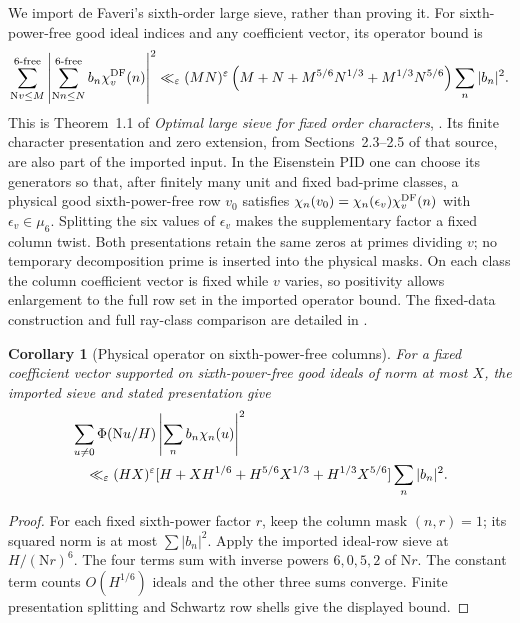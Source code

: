 \documentclass[11pt]{article}
\numberwithin{equation}{section}
\newtheorem{corollary}[theorem]{Corollary}
\theoremstyle{definition}
\theoremstyle{remark}
\newcommand{\N}{\mathrm N}
\newcommand{\eps}{\varepsilon}
\begin{document}
We import de Faveri's sixth-order large sieve, rather than proving it.
For sixth-power-free good ideal indices and any coefficient vector,
its operator bound is
\begin{equation}\label{eq:imported-sextic-sieve}
 \sum_{\N v\le M}^{\text{$6$-free}}
 \left|\sum_{\N n\le N}^{\text{$6$-free}}b_n\chi_v^{\rm DF}(n)\right|^2
 \ll_\eps(MN)^\eps
 \left(M+N+M^{5/6}N^{1/3}+M^{1/3}N^{5/6}\right)\sum_n|b_n|^2.
\end{equation}
This is Theorem~1.1 of \emph{Optimal large sieve for fixed order characters},
\cite{DF}. Its finite character presentation and zero extension,
from Sections~2.3--2.5 of that source, are also part of the imported
input. In the Eisenstein PID one can choose its generators so that,
after finitely many unit and fixed bad-prime classes, a physical good
sixth-power-free row $v_0$ satisfies
$\chi_n(v_0)=\chi_n(\epsilon_v)\chi_v^{\rm DF}(n)$ with
$\epsilon_v\in\mu_6$. Splitting the six values of $\epsilon_v$ makes
the supplementary factor a fixed column twist. Both presentations
retain the same zeros at primes dividing $v$; no temporary decomposition
prime is inserted into the physical masks. On each class the column
coefficient vector is fixed while $v$ varies, so positivity allows
enlargement to the full row set in the imported operator bound.
The fixed-data construction and full ray-class comparison are
detailed in \cite{N6}.

\begin{corollary}[Physical operator on sixth-power-free columns]
\label{cor:physical-operator}
For a fixed coefficient vector supported on sixth-power-free good ideals
of norm at most \(X\), the imported sieve and stated presentation give
\begin{align}
 &\sum_{u\ne0}\Phi(\N u/H)
       \left|\sum_n b_n\chi_n(u)\right|^2\notag\\
 &\quad\ll_\eps(HX)^\eps
 [H+XH^{1/6}+H^{5/6}X^{1/3}+H^{1/3}X^{5/6}]
       \sum_n|b_n|^2. \label{eq:physical-operator}
\end{align}
\end{corollary}
\begin{proof}
For each fixed sixth-power factor \(r\), keep the column mask
\((n,r)=1\); its squared norm is at most \(\sum|b_n|^2\).
Apply the imported ideal-row sieve at \(H/(\N r)^6\).
The four terms sum with inverse powers \(6,0,5,2\) of \(\N r\).
The constant term counts \(O(H^{1/6})\) ideals and the other
three sums converge. Finite presentation splitting and Schwartz
row shells give the displayed bound.
\end{proof}
\end{document}
